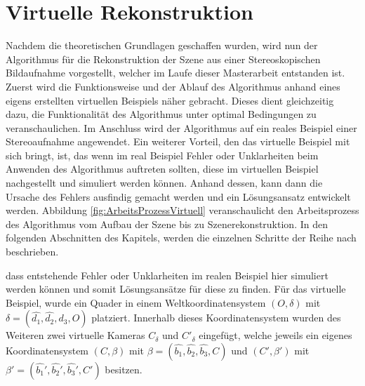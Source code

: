 \chapter{Virtuelle Rekonstruktion}
\label{sec:minimal} 

Nachdem die theoretischen Grundlagen geschaffen wurden, wird nun der Algorithmus für die Rekonstruktion der Szene aus einer Stereoskopischen Bildaufnahme vorgestellt, welcher im Laufe dieser Masterarbeit entstanden ist. Zuerst wird die Funktionsweise und der Ablauf des Algorithmus anhand eines eigens erstellten virtuellen Beispiels näher gebracht. Dieses dient gleichzeitig dazu, die Funktionalität des Algorithmus unter optimal Bedingungen zu veranschaulichen. Im Anschluss wird der Algorithmus auf ein reales Beispiel einer Stereoaufnahme angewendet. Ein weiterer Vorteil, den das virtuelle Beispiel mit sich bringt, ist, das wenn im real Beispiel Fehler oder Unklarheiten beim Anwenden des Algorithmus auftreten sollten, diese im virtuellen Beispiel nachgestellt und simuliert werden können. Anhand dessen, kann dann die Ursache des Fehlers ausfindig gemacht werden und ein Lösungsansatz entwickelt werden. Abbildung \ref{fig:ArbeitsProzessVirtuell} veranschaulicht den Arbeitsprozess des Algorithmus vom Aufbau der Szene bis zu Szenerekonstruktion. In den folgenden Abschnitten des Kapitels, werden die einzelnen Schritte der Reihe nach beschrieben. 

dass entstehende Fehler oder Unklarheiten im realen Beispiel hier simuliert werden können und somit Lösungsansätze für diese zu finden. Für das virtuelle Beispiel, wurde ein Quader in einem Weltkoordinatensystem $(O,\delta)$ mit $\delta = (\hat{d_1},\hat{d_2},\hat{d_3}, O)$ platziert. Innerhalb dieses Koordinatensystem wurden des Weiteren zwei virtuelle Kameras $C_\delta$ und $C'_\delta$ eingefügt, welche jeweils ein eigenes Koordinatensystem  $(C,\beta)$ mit $\beta = (\hat{b_1},\hat{b_2},\hat{b_3},C)$ und  $(C',\beta')$ mit $\beta' = (\hat{b_1}',\hat{b_2}',\hat{b_3}',C')$ besitzen. 
 

